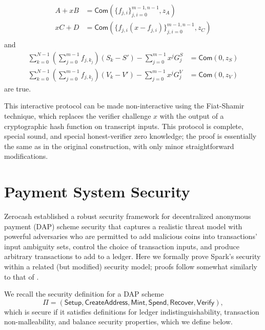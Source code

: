 \documentclass{llncs}
\newcommand{\func}[1]{\mathsf{#1}}
\newcommand{\com}{\func{Com}}
\begin{document}
\begin{enumerate}
    \begin{align*}
        A + xB &= \com(\lbrace f_{j,i} \rbrace_{j,i=0}^{m-1,n-1}, z_A) \\
        xC + D &= \com(\lbrace f_{j,i}(x - f_{j,i})\rbrace_{j,i=0}^{m-1,n-1}, z_C) \\
    \end{align*}
    and
    \begin{align*}
        \sum_{k=0}^{N-1} \left(\sum_{j=0}^{m-1} f_{j,k_j}\right)(S_k - S') - \sum_{j=0}^{m-1} x^jG^S_j &= \com(0, z_S) \\
        \sum_{k=0}^{N-1} \left(\sum_{j=0}^{m-1} f_{j,k_j}\right)(V_k - V') - \sum_{j=0}^{m-1} x^jG^V_j &= \com(0, z_V)
    \end{align*}
    are true.
\end{enumerate}

This interactive protocol can be made non-interactive using the Fiat-Shamir technique, which replaces the verifier challenge $x$ with the output of a cryptographic hash function on transcript inputs.
This protocol is complete, special sound, and special honest-verifier zero knowledge; the proof is essentially the same as in the original construction, with only minor straightforward modifications.


\section{Payment System Security}
\label{app:security}
 
Zerocash \cite{zerocash} established a robust security framework for decentralized anonymous payment (DAP) scheme security that captures a realistic threat model with powerful adversaries who are permitted to add malicious coins into transactions' input ambiguity sets, control the choice of transaction inputs, and produce arbitrary transactions to add to a ledger.
Here we formally prove Spark's security within a related (but modified) security model; proofs follow somewhat similarly to that of \cite{zerocash}.

We recall the security definition for a DAP scheme $$\Pi = (\func{Setup}, \func{CreateAddress}, \func{Mint}, \func{Spend}, \func{Recover}, \func{Verify}),$$ which is secure if it satisfies definitions for ledger indistinguishability, transaction non-malleability, and balance security properties, which we define below.
\end{document}
